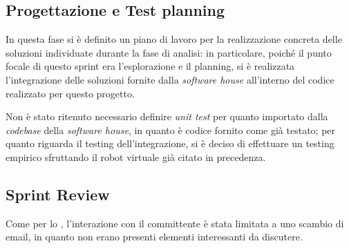 



% 

% 

% 

\subsection{Progettazione e Test planning}

In questa fase si è definito un piano di lavoro per la realizzazione concreta delle soluzioni individuate durante la fase di analisi:
in particolare, poiché il punto focale di questo sprint era l'esplorazione e il planning, si è realizzata l'integrazione delle soluzioni fornite dalla \textit{software house} all'interno del codice realizzato per questo progetto.

Non è stato ritenuto necessario definire \textit{unit test} per quanto importato dalla \textit{codebase} della \textit{software house}, in quanto è codice fornito come già testato;
per quanto riguarda il testing dell'integrazione, si è deciso di effettuare un testing empirico sfruttando il robot virtuale già citato in precedenza.

\subsection{Sprint Review}

Come per lo , l'interazione con il committente è stata limitata a uno scambio di email, in quanto non erano presenti elementi interessanti da discutere.
